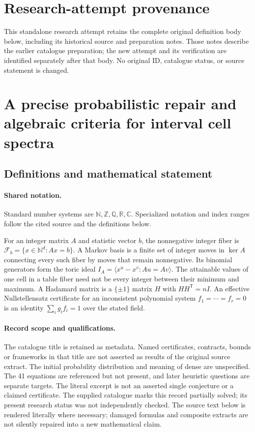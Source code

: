 \documentclass[11pt]{article}
\begin{document}
\section*{Research-attempt provenance}
This standalone research attempt retains the complete original definition body below,
including its historical source and preparation notes. Those notes describe the
earlier catalogue preparation; the new attempt and its verification are identified
separately after that body. No original ID, catalogue status, or source statement is changed.

\section{A precise probabilistic repair and algebraic criteria for interval cell spectra}\label{statement}

\subsection{Definitions and mathematical statement}

\paragraph{Shared notation.}Standard number systems are $\mathbb N,\mathbb Z,\mathbb Q,\mathbb R,\mathbb C$. Specialized notation and index ranges follow the cited source and the definitions below.


For an integer matrix $A$ and statistic vector $b$, the nonnegative integer fiber is $\mathcal F_b=\{x\in\mathbb N^d:Ax=b\}$. A Markov basis is a finite set of integer moves in $\ker A$ connecting every such fiber by moves that remain nonnegative. Its binomial generators form the toric ideal $I_A=\langle x^u-x^v:Au=Av\rangle$. The attainable values of one cell in a table fiber need not be every integer between their minimum and maximum. A Hadamard matrix is a $\{\pm1\}$ matrix $H$ with $HH^{\mathsf T}=nI$. An effective Nullstellensatz certificate for an inconsistent polynomial system $f_1=\cdots=f_r=0$ is an identity $\sum_i g_if_i=1$ over the stated field.
\paragraph{Record scope and qualifications.}
The catalogue title is retained as metadata. Named certificates, contracts, bounds or frameworks in that title are not asserted as results of the original source extract.
The initial probability distribution and meaning of dense are unspecified. The 41 equations are referenced but not present, and later heuristic questions are separate targets. The literal excerpt is not an asserted single conjecture or a claimed certificate. The supplied catalogue marks this record partially solved; its present research status was not independently checked.
The source text below is rendered literally where necessary; damaged formulas and composite extracts are not silently repaired into a new mathematical claim.
\end{document}
